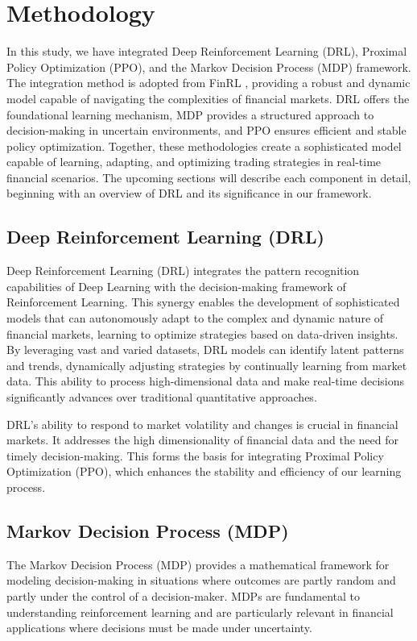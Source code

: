 \section{Methodology}
In this study, we have integrated Deep Reinforcement Learning (DRL), Proximal Policy Optimization (PPO), and the Markov Decision Process (MDP) framework. The integration method is adopted from FinRL \cite{Liu2022FinRL}, providing a robust and dynamic model capable of navigating the complexities of financial markets. DRL offers the foundational learning mechanism, MDP provides a structured approach to decision-making in uncertain environments, and PPO ensures efficient and stable policy optimization. Together, these methodologies create a sophisticated model capable of learning, adapting, and optimizing trading strategies in real-time financial scenarios. The upcoming sections will describe each component in detail, beginning with an overview of DRL and its significance in our framework.

\subsection{Deep Reinforcement Learning (DRL)}
Deep Reinforcement Learning (DRL) integrates the pattern recognition capabilities of Deep Learning with the decision-making framework of Reinforcement Learning. This synergy enables the development of sophisticated models that can autonomously adapt to the complex and dynamic nature of financial markets, learning to optimize strategies based on data-driven insights. By leveraging vast and varied datasets, DRL models can identify latent patterns and trends, dynamically adjusting strategies by continually learning from market data. This ability to process high-dimensional data and make real-time decisions significantly advances over traditional quantitative approaches.

DRL's ability to respond to market volatility and changes is crucial in financial markets. It addresses the high dimensionality of financial data and the need for timely decision-making. This forms the basis for integrating Proximal Policy Optimization (PPO), which enhances the stability and efficiency of our learning process.



\subsection{Markov Decision Process (MDP)}
The Markov Decision Process (MDP) provides a mathematical framework for modeling decision-making in situations where outcomes are partly random and partly under the control of a decision-maker. MDPs are fundamental to understanding reinforcement learning and are particularly relevant in financial applications where decisions must be made under uncertainty. 

